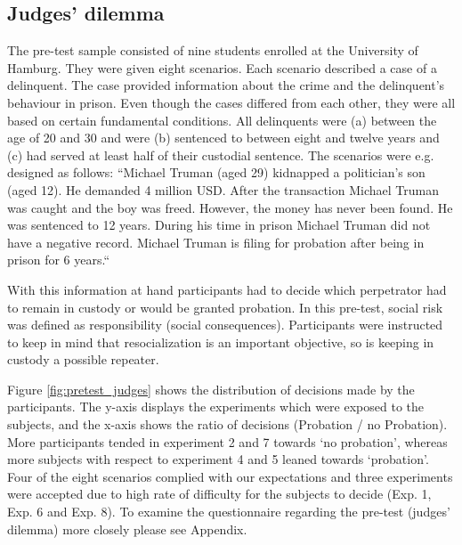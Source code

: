 \subsection{Judges’ dilemma}
The pre-test sample consisted of nine students enrolled at the University of Hamburg. They were given eight scenarios. Each scenario described a case of a delinquent. The case provided information about the crime and the delinquent’s behaviour in prison. Even though the cases differed from each other, they were all based on certain fundamental conditions. All delinquents were (a) between the age of 20 and 30 and were (b) sentenced to between eight and twelve years and (c) had served at least half of their custodial sentence. The scenarios were e.g. designed as follows: “Michael Truman (aged 29) kidnapped a politician's son (aged 12). He demanded 4 million USD. After the transaction Michael Truman was caught and the boy was freed. However, the money has never been found. He was sentenced to 12 years. During his time in prison Michael Truman did not have a negative record. Michael Truman is filing for probation after being in prison for 6 years.“\par
With this information at hand participants had to decide which perpetrator had to remain in custody or would be granted probation. In this pre-test, social risk was defined as responsibility (social consequences). Participants were instructed to keep in mind that resocialization is an important objective, so is keeping in custody a possible repeater.\par
Figure \ref{fig:pretest_judges} shows the distribution of decisions made by the participants. The y-axis displays the experiments which were exposed to the subjects, and the x-axis shows the ratio of decisions (Probation / no Probation). More participants tended in experiment 2 and 7 towards ‘no probation’, whereas more subjects with respect to experiment 4 and 5 leaned towards ‘probation’. Four of the eight scenarios complied with our expectations and three experiments were accepted due to high rate of difficulty for the subjects to decide (Exp. 1, Exp. 6 and Exp. 8). To examine the questionnaire regarding the pre-test (judges’ dilemma) more closely please see Appendix.

